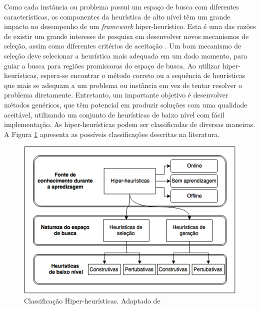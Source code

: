 Como cada instância ou problema possui um espaço de busca com diferentes características, os componentes da heurística de alto nível têm um grande impacto no desempenho de um \textit{framework} hiper-heurístico. Esta é uma das razões de existir um grande interesse de pesquisa em desenvolver  novos mecanismos de seleção, assim como diferentes critérios de aceitação \cite{burke2013hyper}. Um bom mecanismo de seleção deve selecionar a heurística mais adequada em um dado momento, para guiar a busca para regiões promissoras do espaço de busca. 
Ao utilizar hiper-heurísticas, espera-se encontrar o método correto ou a sequência de heurísticas que mais se adequam a um problema ou instância em vez de tentar resolver o problema diretamente. Entretanto, um importante objetivo é desenvolver métodos genéricos, que têm  potencial em produzir soluções com uma qualidade aceitável, utilizando um conjunto de heurísticas de baixo nível com fácil implementação. As hiper-heurísticas podem ser classificadas de diversas maneiras. A Figura \ref{img:classificacaoHiperHeuristicas} apresenta as possíveis classificações descritas na literatura. 

\begin{figure}[!htb]
	\centering
	\includegraphics[scale=0.8]{Imagens/ClassificacaoHiperHeuristica.png}
	\caption{Classificação Hiper-heurísticas. Adaptado de \cite{sabar2015automatic}}
	\label{img:classificacaoHiperHeuristicas}
\end{figure}

